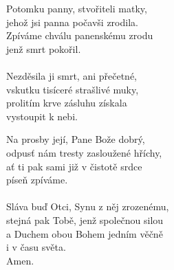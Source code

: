 \begin{translatioMulticol}{2}
Potomku panny, stvořiteli matky,\\
jehož jsi panna počavši zrodila.\\
Zpíváme chválu panenskému zrodu\\
jenž smrt pokořil.\\
\\
Nezděsila ji smrt, ani přečetné,\\
vskutku tisíceré strašlivé muky,\\
prolitím krve zásluhu získala\\
vystoupit k nebi.\columnbreak

Na prosby její, Pane Bože dobrý,\\
odpusť nám tresty zasloužené hříchy,\\
ať ti pak sami již v čistotě srdce\\
píseň zpíváme.\\
\\
Sláva buď Otci, Synu z něj zrozenému,\\
stejná pak Tobě, jenž společnou silou\\
a Duchem obou Bohem jedním věčně\\
i v času světa.\\
Amen.
\end{translatioMulticol}
